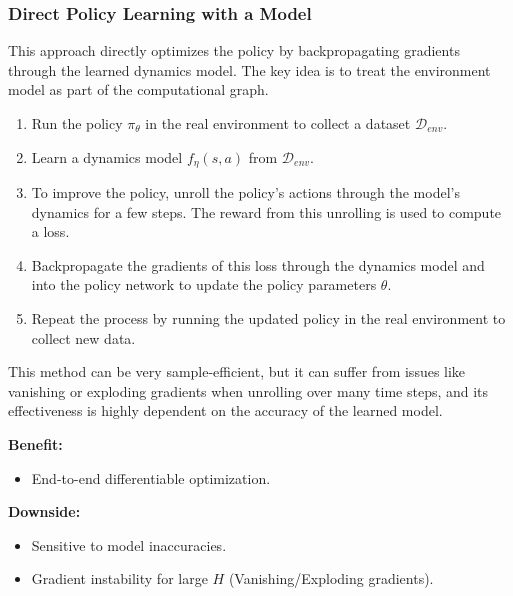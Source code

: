 \documentclass[12pt]{article}
\begin{document}
\subsubsection{Direct Policy Learning with a Model }
This approach directly optimizes the policy by backpropagating gradients through the learned dynamics model. The key idea is to treat the environment model as part of the computational graph.
\begin{enumerate}
    \item Run the policy $\pi_\theta$ in the real environment to collect a dataset $\mathcal{D}_{env}$.
    \item Learn a dynamics model $f_\eta(s,a)$ from $\mathcal{D}_{env}$.
    \item To improve the policy, unroll the policy's actions through the model's dynamics for a few steps. The reward from this unrolling is used to compute a loss.
    \item Backpropagate the gradients of this loss through the dynamics model and into the policy network to update the policy parameters $\theta$.
    \item Repeat the process by running the updated policy in the real environment to collect new data.
\end{enumerate}
This method can be very sample-efficient, but it can suffer from issues like vanishing or exploding gradients when unrolling over many time steps, and its effectiveness is highly dependent on the accuracy of the learned model.

\item \textbf{Benefit:}
\begin{itemize}
    \item End-to-end differentiable optimization.
\end{itemize}
\textbf{Downside:}
\begin{itemize}
    \item Sensitive to model inaccuracies.
    \item Gradient instability for large $H$ (Vanishing/Exploding gradients).
\end{itemize}
\end{document}
